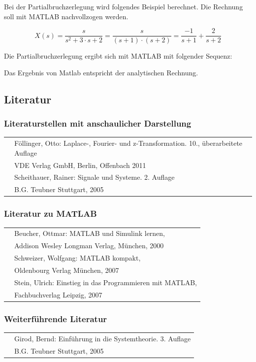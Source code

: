 \noindent Bei der Partialbruchzerlegung wird folgendes Beispiel berechnet. Die Rechnung soll mit MATLAB nachvollzogen werden.

\begin{equation}\label{eq:fourhundredsixtyone}
X(s)=\frac{s}{s^{2} +3\cdot s+2} =\frac{s}{(s+1)\cdot (s+2)} =\frac{-1}{s+1} +\frac{2}{s+2} 
\end{equation}

\noindent Die Partialbruchzerlegung ergibt sich mit MATLAB mit folgender Sequenz:



\noindent Das Ergebnis von Matlab entspricht der analytischen Rechnung.

\clearpage

\subsection{ Literatur}


\subsubsection{ Literaturstellen mit anschaulicher Darstellung}

\begin{tabular}{|p{0.6in}|p{5.7in}|} \hline 
[Foel11] & F\"{o}llinger, Otto: Laplace-, Fourier- und z-Transformation. 10., \"{u}berarbeitete Auflage\\
& VDE Verlag GmbH, Berlin, Offenbach 2011 \\ \hline 
[Schei05] & Scheithauer, Rainer: Signale und Systeme. 2. Auflage\\
& B.G. Teubner Stuttgart, 2005\\ \hline 
\end{tabular}


\subsubsection{ Literatur zu MATLAB}

\begin{tabular}{|p{0.6in}|p{5.7in}|} \hline 
[Beuc00] & Beucher, Ottmar: MATLAB und Simulink lernen,\\
& Addison Wesley Longman Verlag, M\"{u}nchen, 2000 \\ \hline 
[Schw07] & Schweizer, Wolfgang: MATLAB kompakt,\\
& Oldenbourg Verlag M\"{u}nchen, 2007 \\ \hline 
[Stei07] & Stein, Ulrich: Einstieg in das Programmieren mit MATLAB,\\
& Fachbuchverlag Leipzig, 2007 \\ \hline 
\end{tabular}


\subsubsection{ Weiterf\"{u}hrende Literatur}

\begin{tabular}{|p{0.6in}|p{5.7in}|} \hline 
[Giro05] & Girod, Bernd: Einf\"{u}hrung in die Systemtheorie. 3. Auflage\\
& B.G. Teubner Stuttgart, 2005 
\end{tabular}